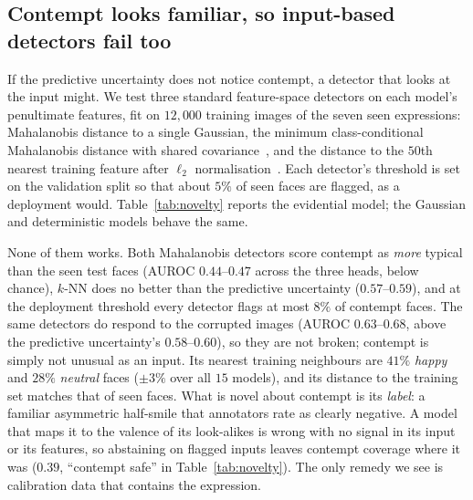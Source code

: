 \subsection{Contempt looks familiar, so input-based detectors fail too}
\label{sec:novelty}
If the predictive uncertainty does not notice contempt, a detector that looks
at the input might. We test three standard feature-space detectors on each
model's penultimate features, fit on $12{,}000$ training images of the seven
seen expressions: Mahalanobis distance to a single Gaussian, the minimum
class-conditional Mahalanobis distance with shared covariance~\cite{lee2018simple},
and the distance to the $50$th nearest training feature after $\ell_2$
normalisation~\cite{sun2022knn}. Each detector's threshold is set on the
validation split so that about $5\%$ of seen faces are flagged, as a deployment
would. Table~\ref{tab:novelty} reports the evidential model; the Gaussian and
deterministic models behave the same.

None of them works. Both Mahalanobis detectors score contempt as \emph{more}
typical than the seen test faces (AUROC $0.44$--$0.47$ across the three heads,
below chance), $k$-NN does no better than the predictive uncertainty
($0.57$--$0.59$), and at the deployment threshold every detector flags at most
$8\%$ of contempt faces. The same detectors do respond to the corrupted images
(AUROC $0.63$--$0.68$, above the predictive uncertainty's $0.58$--$0.60$), so they
are not broken; contempt is simply not unusual as an input. Its nearest training
neighbours are $41\%$ \emph{happy} and $28\%$ \emph{neutral} faces ($\pm3\%$
over all $15$ models), and its distance to the training set matches that of
seen faces. What is novel about contempt is its \emph{label}: a familiar
asymmetric half-smile that annotators rate as clearly negative. A model that
maps it to the valence of its look-alikes is wrong with no signal in its input
or its features, so abstaining on flagged inputs leaves contempt coverage where
it was ($0.39$, ``contempt safe'' in Table~\ref{tab:novelty}). The only remedy we
see is calibration data that contains the expression.

\begin{table}[h]
  \centering\small
  \resizebox{\linewidth}{!}{}
  \caption{Detecting the unseen expression (evidential model, five seeds). AUROC
  separates contempt from seen test faces. Flagged: fraction above a threshold
  set on validation to flag about $5\%$ of seen faces. Contempt safe: fraction of
  contempt that is either flagged or covered by the joint region. Shift AUROC:
  clean versus corrupted test images.}
  \label{tab:novelty}
\end{table}

